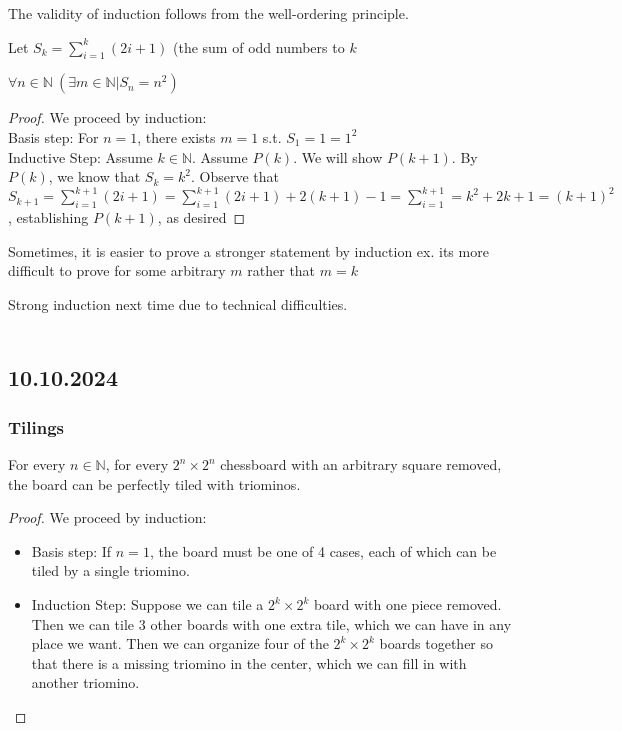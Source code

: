 \documentclass[11pt]{scrartcl}
\begin{document}
\begin{remark}
    The validity of induction follows from the well-ordering principle.
\end{remark}
Let $S_k = \sum_{i=1}^{k}(2i+1)$ (the sum of odd numbers to $k$
\begin{proposition}
    $\forall n \in \mathbb{N}~ (\exists m \in \mathbb{N} | S_n = n^2)$
\end{proposition}
\begin{proof}
    We proceed by induction:\\
    Basis step: For $n=1$, there exists $m=1$ s.t. $S_1 = 1 = 1^2$\\
    Inductive Step: Assume $k \in \mathbb{N}$. Assume $P(k)$. We will show $P(k+1)$. By $P(k)$, we know that $S_k = k^2$. Observe that $S_{k+1} = \sum_{i=1}^{k+1}(2i+1)= \sum_{i=1}^{k+1}(2i+1) + 2(k+1) - 1 = \sum_{i=1}^{k+1} = k^2 + 2k + 1 = (k+1)^2$, establishing $P(k+1)$, as desired 
\end{proof}
\begin{remark}
    Sometimes, it is easier to prove a stronger statement by induction ex. its more difficult to prove for some arbitrary $m$ rather that $m = k$
\end{remark}
Strong induction next time due to technical difficulties. \\
\noindent
\Line
\\
\subsection{10.10.2024}
\subsubsection{Tilings}
\begin{proposition}
    For every $n \in \mathbb{N}$, for every $2^n \times 2^n$ chessboard with an arbitrary square removed, the board can be perfectly tiled with  triominos.
\end{proposition}

\begin{proof}
    We proceed by induction:
    \begin{itemize}
        \item Basis step: If $n=1$, the board must be one of 4 cases, each of which can be tiled by a single triomino.
        \item Induction Step: Suppose we can tile a $2^k\times 2^k$ board with one piece removed. Then we can tile $3$ other boards with one extra tile, which we can have in any place we want.  Then we can organize four of the $2^k\times2^k$ boards together so that there is a missing triomino in the center, which we can fill in with another triomino.
    \end{itemize}
\end{proof}
\end{document}
